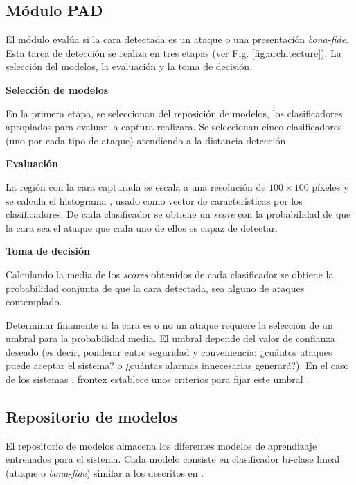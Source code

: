 \subsection{Módulo PAD}

El módulo  evalúa si la cara detectada es un ataque o una presentación \textit{\gls{bona-fide}}. Esta tarea de detección se realiza en tres etapas (ver Fig. \ref{fig:architecture}): La selección del modelos, la evaluación y la toma de decisión.

\medskip
\textbf{Selección de modelos} %

En la primera etapa, se seleccionan del reposición de modelos, los clasificadores apropiados para evaluar la captura realizara. Se seleccionan cinco clasificadores (uno por cada tipo de ataque) atendiendo a la distancia detección.

\medskip
\textbf{Evaluación} %

La región con la cara capturada se escala a una resolución de $100\times100$ píxeles y se calcula el histograma  \cite{ojala1996comparative}, usado como vector de características por los clasificadores. De cada clasificador se obtiene un \textit{score} con la probabilidad de que la cara sea el ataque que cada uno de ellos es capaz de detectar.  

\medskip
\textbf{Toma de decisión} %

Calculando la media de los \textit{scores} obtenidos de cada clasificador se obtiene la probabilidad conjunta de que la cara detectada, sea alguno de ataques contemplado. 
\medskip

Determinar finamente si la cara es o no un ataque requiere la selección de un umbral para la probabilidad media. El umbral depende del valor de confianza deseado (es decir, ponderar entre seguridad y conveniencia: ¿cuántos ataques puede aceptar el sistema? o ¿cuántas alarmas innecesarias generará?). En el caso de los sistemas , \Gls{frontex} establece unos criterios para fijar este umbral \cite{FRONTEX2016OpeReport}.


\subsection{Repositorio de modelos} 

El repositorio de modelos almacena los diferentes modelos de aprendizaje entrenados para el sistema. Cada modelo consiste en clasificador  \cite{ma2014support} bi-clase lineal (ataque o \textit{\gls{bona-fide}}) similar a los descritos en \cite{chingovska2012effectiveness}.

